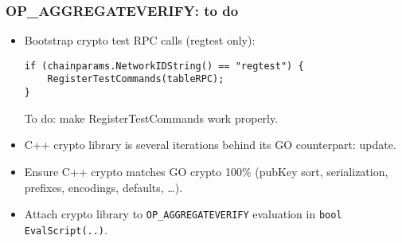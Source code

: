 \begin{frame}[fragile]
\frametitle{OP\_AGGREGATEVERIFY: to do}
\begin{itemize}
\item Bootstrap crypto test RPC calls (regtest only):
\begin{verbatim}
if (chainparams.NetworkIDString() == "regtest") {
    RegisterTestCommands(tableRPC);
}
\end{verbatim}

To do: make RegisterTestCommands work properly.
\item C++ crypto library is several iterations behind its GO counterpart: update.
\item Ensure C++ crypto matches GO crypto 100\% (pubKey sort, serialization, prefixes, encodings, defaults, \dots).
\item Attach crypto library to \verb|OP_AGGREGATEVERIFY| evaluation in \verb|bool EvalScript(..)|.
\end{itemize}
\end{frame}